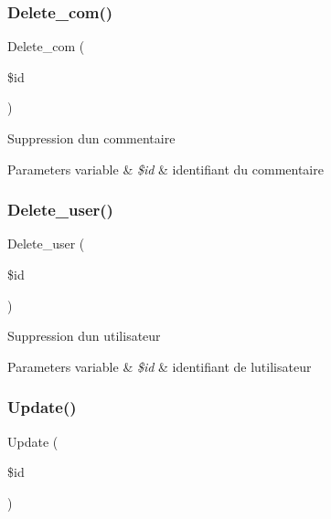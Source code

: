 \subsubsection{\texorpdfstring{Delete\+\_\+com()}{Delete\_com()}}
{\footnotesize\ttfamily Delete\+\_\+com (\begin{DoxyParamCaption}\item[{}]{\$id }\end{DoxyParamCaption})}

Suppression d\textquotesingle{}un commentaire 
\begin{DoxyParams}[1]{Parameters}
variable & {\em \$id} & identifiant du commentaire \\
\hline
\end{DoxyParams}
\mbox{\label{class_src_1_1_controllers_1_1_backedit_ac8f9af14ff73b939d55940eb2ff886ee}} 
\subsubsection{\texorpdfstring{Delete\+\_\+user()}{Delete\_user()}}
{\footnotesize\ttfamily Delete\+\_\+user (\begin{DoxyParamCaption}\item[{}]{\$id }\end{DoxyParamCaption})}

Suppression d\textquotesingle{}un utilisateur 
\begin{DoxyParams}[1]{Parameters}
variable & {\em \$id} & identifiant de l\textquotesingle{}utilisateur \\
\hline
\end{DoxyParams}
\mbox{\label{class_src_1_1_controllers_1_1_backedit_a82232b33fbfacdbdb8a8f49acaecf564}} 
\subsubsection{\texorpdfstring{Update()}{Update()}}
{\footnotesize\ttfamily Update (\begin{DoxyParamCaption}\item[{}]{\$id }\end{DoxyParamCaption})}

